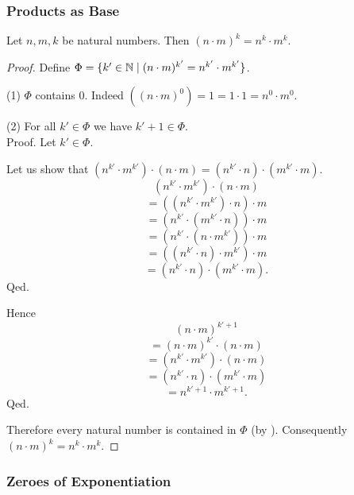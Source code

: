 \documentclass[10pt]{article}
\begin{document}
  \subsubsection*{Products as Base}

  \begin{forthel}
    \begin{proposition}
      Let $n, m, k$ be natural numbers.
      Then $(n \cdot m)^{k} = n^{k} \cdot m^{k}$.
    \end{proposition}
    \begin{proof}
      Define $\Phi = \{ k' \in \mathbb{N} \mid (n \cdot m)^{k'} = n^{k'} \cdot m^{k'} \}$.

      (1) $\Phi$ contains $0$.
      Indeed $((n \cdot m)^{0})
        = 1
        = 1 \cdot 1
        = n^{0} \cdot m^{0}$. %

      (2) For all $k' \in \Phi$ we have $k' + 1 \in \Phi$. \\
      Proof.
        Let $k' \in \Phi$.

        Let us show that $(n^{k'} \cdot m^{k'}) \cdot (n \cdot m) = (n^{k'} \cdot n) \cdot (m^{k'} \cdot m)$.
          \[  (n^{k'} \cdot m^{k'}) \cdot (n \cdot m)       \]
          \[    = ((n^{k'} \cdot m^{k'}) \cdot n) \cdot m   \]
          \[    = (n^{k'} \cdot (m^{k'} \cdot n)) \cdot m   \]
          \[    = (n^{k'} \cdot (n \cdot m^{k'})) \cdot m   \]
          \[    = ((n^{k'} \cdot n) \cdot m^{k'}) \cdot m   \]
          \[    = (n^{k'} \cdot n) \cdot (m^{k'} \cdot m).  \]
        Qed.

        Hence
        \[  (n \cdot m)^{k' + 1}                          \]
        \[    = (n \cdot m)^{k'} \cdot (n \cdot m)        \]
        \[    = (n^{k'} \cdot m^{k'}) \cdot (n \cdot m)   \]
        \[    = (n^{k'} \cdot n) \cdot (m^{k'} \cdot m)   \]
        \[    = n^{k' + 1} \cdot m^{k' + 1}.              \]
      Qed.

      Therefore every natural number is contained in $\Phi$ (by ).
      Consequently $(n \cdot m)^{k} = n^{k} \cdot m^{k}$.
    \end{proof}
  \end{forthel}


  \subsubsection*{Zeroes of Exponentiation}
\end{document}
